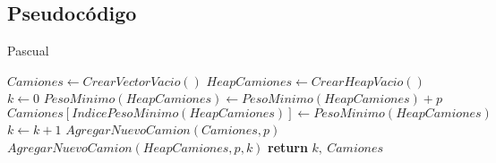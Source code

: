 \subsection{Pseudoc\'odigo}

\begin{algorithm}
\caption{Pascual}\label{pascual}
\begin{algorithmic}[1]
	\State $Camiones\gets CrearVectorVacio()$
	\State $HeapCamiones\gets CrearHeapVacio()$
	\State $k\gets 0$
			\State $PesoMinimo(HeapCamiones)\gets PesoMinimo(HeapCamiones)+p$
			\State $Camiones[IndicePesoMinimo(HeapCamiones)]\gets PesoMinimo(HeapCamiones)$\\
		\Else
			\State $k\gets k+1$
			\State $AgregarNuevoCamion(Camiones, p)$
			\State $AgregarNuevoCamion(HeapCamiones, p, k)$
		\EndIf
	\EndFor\label{pascual}
\State \textbf{return} $k,\ Camiones$
\EndProcedure
\end{algorithmic}
\end{algorithm}